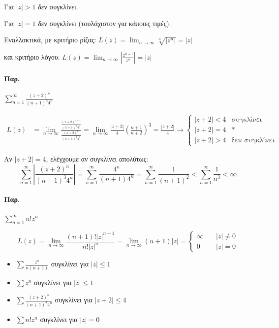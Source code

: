 \documentclass[12pt,a4paper,notitlepage,fleqn]{article}
\begin{document}
     Για \( |z|>1 \) δεν συγκλίνει.

     Για \( |z|=1 \) δεν συγκλίνει (τουλάχιστον για κάποιες τιμές).

     Εναλλακτικά, με κριτήριο ρίζας: \( L(z)=\lim_{n\to \infty}
     \sqrt[n]{\left|z^n\right|} = |z|
      \)

     και κριτήριο λόγου: \( L(z) = \lim_{n\to\infty}\left|
     \frac{z^{n+1}}{z^n}\right| =|z| \)


     \paragraph{Παρ.}
     \( \sum_{n=1}^\infty \frac{(z+2)^n}{(n+1)^3 4^n} \)

     \begin{align*}
     L(z) &= \lim_{n\to \infty}\frac{\frac{(z+2)^{n+1}}{(n+1)^3 4^n}}{
     	\frac{(z+2)^n}{(n+1)^3 4^n}
     	} = \lim_{n\to\infty} \frac{|z+2|}{4}\left(
     	\frac{n+1}{n+2}
     	\right)^3= \frac{|z+2|}{4} \to \begin{cases}
     	|z+2| < 4 & \text{συγκλίνει} \\
     	|z+2| = 4 & * \text{} \\
     	|z+2| > 4 & \text{δεν συγκλίνει}
     	\end{cases}
     \end{align*}

     Αν \( |z+2|= 4 \), ελέγχουμε αν συγκλίνει απολύτως: \[
     \sum_{n=1}^\infty \left| \frac{(z+2)^n}{(n+1)^3 4^n} \right|
     = \sum_{n=1}^\infty \frac{4^n}{(n+1) 4^n} = \sum_{n=1}^\infty
     \frac{1}{(n+1)^2} < \sum_{n=1}^\infty \frac{1}{n^3} < \infty
      \]

   \paragraph{Παρ.} \( \sum_{n=1}^\infty n!z^n \)

   \[
   L(z) = \lim_{n\to \infty} \frac{(n+1)!|z|^{n+1}}{n!|z|^n}
   = \lim_{n\to \infty}(n+1)|z|=\begin{cases}
   \infty \quad & |z| \neq 0 \\
   0 \quad & |z| = 0
   \end{cases}
   \]

  \begin{infobox}{}
     	\begin{itemize}
     		\item
     		\( \displaystyle \sum\frac{z^n}{n(n+1)} \) συγκλίνει για \( |z|\leq 1 \)
     		\item
     		\( \displaystyle \sum z^n \) συγκλίνει για \( |z|\leq 1 \)
     		\item
     		\( \displaystyle \sum \frac{(z+2)^n}{(n+1)^3 4^n} \)
     		συγκλίνει για \( |z+2| \leq 4 \)
     		\item
     		\( \displaystyle \sum n!z^n \) συγκλίνει για \( |z| = 0 \)
     	\end{itemize}
  \end{infobox}
  
\end{document}
